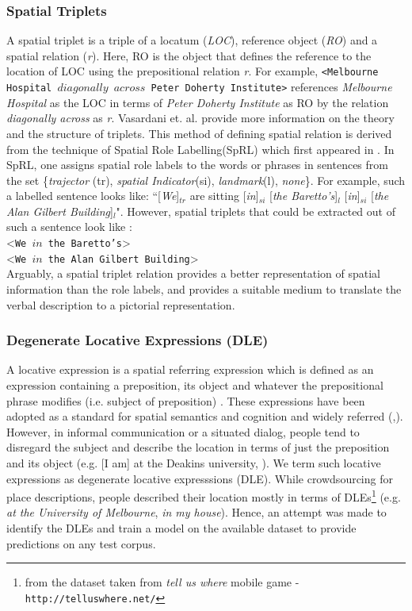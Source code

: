 \documentclass{acm_proc_article-sp}
\begin{document}
\subsubsection{Spatial Triplets}
A spatial triplet is a triple of a locatum (\textit{LOC}), reference object (\textit{RO}) and a spatial relation (\textit{r}). Here, RO is the object that defines the reference to the location of LOC using the prepositional relation \textit{r}. For example, \texttt{<Melbourne Hospital $diagonally$ $across$ Peter Doherty Institute>} references \textit{Melbourne Hospital} as the LOC in terms of \textit{Peter Doherty Institute} as RO by the relation \textit{diagonally across} as \textit{r}. Vasardani et. al. \cite{maria:descriptions} provide more information on the theory and the structure of triplets. This method of defining spatial relation is derived from the technique of Spatial Role Labelling(SpRL) which first appeared in \cite{Kordjamshidi:labelling}. In SpRL, one assigns spatial role labels to the words or phrases in sentences from the set \{\textit{trajector} (tr), \textit{spatial Indicator}(si), \textit{landmark}(l), \textit{none}\}. For example, such a labelled sentence looks like:
``[\textit{We}]$_{tr}$ are sitting [\textit{in}]$_{si}$ [\textit{the Baretto's}]$_l$ [\textit{in}]$_{si}$ [\textit{the Alan Gilbert Building}]$_{l}$". However, spatial triplets that could be extracted out of such a sentence look like : \\<\texttt{We ${in}$ the Baretto's}> \\<\texttt{We ${in}$ the Alan Gilbert Building}>\\ 
Arguably, a spatial triplet relation provides a better representation of spatial information than the role labels, and provides a suitable medium to translate the verbal description to a pictorial representation. 
\subsubsection{Degenerate Locative Expressions (DLE)}
\label{DLE}
A locative expression is a spatial referring expression which is defined as an expression containing a preposition, its object and whatever the prepositional phrase modifies (i.e. subject of preposition) \cite{herskovits:pragmatics}. These expressions have been adopted as a standard for spatial semantics and cognition and widely referred (\cite{olivier:semantics},\cite{zlatev:semantics}). However, in informal communication or a situated dialog, people tend to disregard the subject and describe the location in terms of just the preposition and its object (e.g. [I am] at the Deakins university, ). We term such locative expressions as degenerate locative expresssions (DLE). While crowdsourcing for place descriptions, people described their location mostly in terms of DLEs\footnote{from the dataset taken from \textit{tell us where} mobile game - \texttt{http://telluswhere.net/}} (e.g. \textit{at the University of Melbourne}, \textit{in my house}). Hence, an attempt was made to identify the DLEs and train a model on the available dataset to provide predictions on any test corpus.
\end{document}
